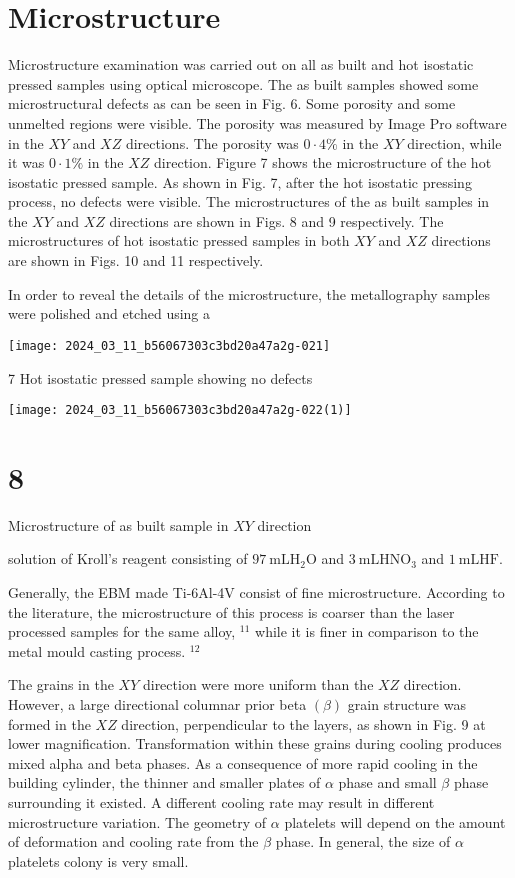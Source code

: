 \documentclass[10pt]{article}
\begin{document}
\section*{Microstructure}
Microstructure examination was carried out on all as built and hot isostatic pressed samples using optical microscope. The as built samples showed some microstructural defects as can be seen in Fig. 6. Some porosity and some unmelted regions were visible. The porosity was measured by Image Pro software in the $X Y$ and $X Z$ directions. The porosity was $0 \cdot 4 \%$ in the $X Y$ direction, while it was $0 \cdot 1 \%$ in the $X Z$ direction. Figure 7 shows the microstructure of the hot isostatic pressed sample. As shown in Fig. 7, after the hot isostatic pressing process, no defects were visible. The microstructures of the as built samples in the $X Y$ and $X Z$ directions are shown in Figs. 8 and 9 respectively. The microstructures of hot isostatic pressed samples in both $X Y$ and $X Z$ directions are shown in Figs. 10 and 11 respectively.

In order to reveal the details of the microstructure, the metallography samples were polished and etched using a

\begin{center}
\texttt{[image: 2024\_03\_11\_b56067303c3bd20a47a2g-021]}
\end{center}

7 Hot isostatic pressed sample showing no defects

\begin{center}
\texttt{[image: 2024\_03\_11\_b56067303c3bd20a47a2g-022(1)]}
\end{center}

\section*{8}
Microstructure of as built sample in $X Y$ direction

solution of Kroll's reagent consisting of $97 \mathrm{~mL} \mathrm{H}_{2} \mathrm{O}$ and $3 \mathrm{~mL} \mathrm{HNO}_{3}$ and $1 \mathrm{~mL} \mathrm{HF}$.

Generally, the EBM made Ti-6Al-4V consist of fine microstructure. According to the literature, the microstructure of this process is coarser than the laser processed samples for the same alloy, ${ }^{11}$ while it is finer in comparison to the metal mould casting process. ${ }^{12}$

The grains in the $X Y$ direction were more uniform than the $X Z$ direction. However, a large directional columnar prior beta $(\beta)$ grain structure was formed in the $X Z$ direction, perpendicular to the layers, as shown in Fig. 9 at lower magnification. Transformation within these grains during cooling produces mixed alpha and beta phases. As a consequence of more rapid cooling in the building cylinder, the thinner and smaller plates of $\alpha$ phase and small $\beta$ phase surrounding it existed. A different cooling rate may result in different microstructure variation. The geometry of $\alpha$ platelets will depend on the amount of deformation and cooling rate from the $\beta$ phase. In general, the size of $\alpha$ platelets colony is very small.
\end{document}
